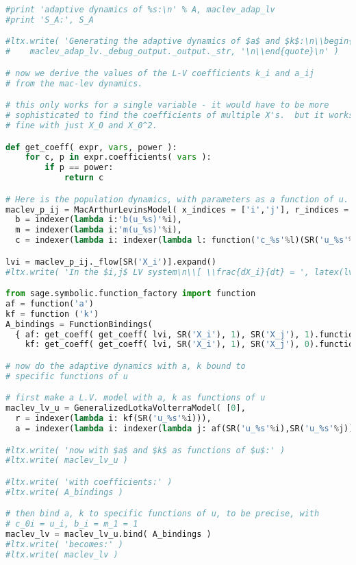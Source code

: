 \begin{lstlisting}[language=Python]
#print 'adaptive dynamics of %s:\n' % A, maclev_adap_lv
#print 'S_A:', S_A

#ltx.write( 'Generating the adaptive dynamics of $a$ and $k$:\n\\begin{quote}\n',
#    maclev_adap_lv._debug_output._output._str, '\n\\end{quote}\n' )

# now we derive the values of the L-V coefficients k_i and a_ij 
# from the mac-lev dynamics.

# this only works for a single variable - it would have to be more
# sophisticated to find the coefficients of multiple X's.  but it works
# fine with just X_0 and X_0^2.

def get_coeff( expr, vars, power ):
    for c, p in expr.coefficients( vars ):
        if p == power:
            return c

# Here is the population dynamics, with parameters as a function of u.
maclev_p_ij = MacArthurLevinsModel( x_indices = ['i','j'], r_indices = [0],
  b = indexer(lambda i:'b(u_%s)'%i),
  m = indexer(lambda i:'m(u_%s)'%i),
  c = indexer(lambda i: indexer(lambda l: function('c_%s'%l)(SR('u_%s'%i)) ) ) )

lvi = maclev_p_ij._flow[SR('X_i')].expand()
#ltx.write( 'In the $i,j$ LV system\n\\[ \\frac{dX_i}{dt} = ', latex(lvi), ' \\]\n\n' );

from sage.symbolic.function_factory import function
af = function('a')
kf = function ('k')
A_bindings = FunctionBindings(
  { af: get_coeff( get_coeff( lvi, SR('X_i'), 1), SR('X_j'), 1).function(SR('u_i'), SR('u_j')),
    kf: get_coeff( get_coeff( lvi, SR('X_i'), 1), SR('X_j'), 0).function(SR('u_i')) } )

# now do the adaptive dynamics with a, k bound to
# specific functions of u

# first make a L.V. model with a, k as functions of u
maclev_lv_u = GeneralizedLotkaVolterraModel( [0],
  r = indexer(lambda i: kf(SR('u_%s'%i))),
  a = indexer(lambda i: indexer(lambda j: af(SR('u_%s'%i),SR('u_%s'%j)))) )

#ltx.write( 'now with $a$ and $k$ as functions of $u$:' )
#ltx.write( maclev_lv_u )

#ltx.write( 'with coefficients:' )
#ltx.write( A_bindings )

# then bind a, k to specific functions of u, to be precise, with
# c_0i = u_i, b_i = m_1 = 1
maclev_lv = maclev_lv_u.bind( A_bindings )
#ltx.write( 'becomes:' )
#ltx.write( maclev_lv )


\end{lstlisting}
